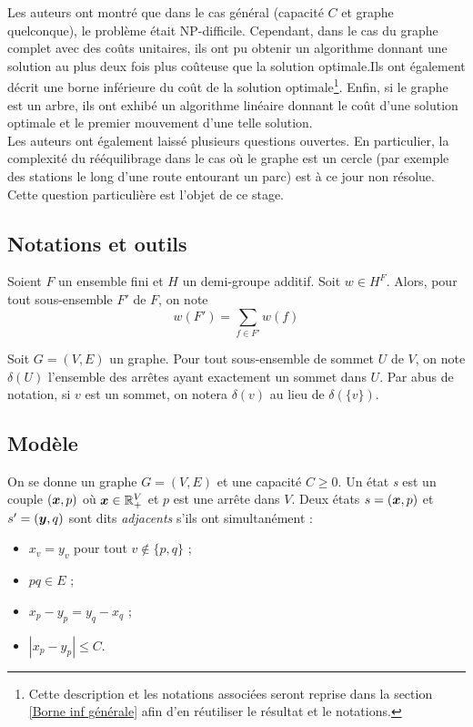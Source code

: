 \documentclass[twoside,11pt,openany,a4paper]{rapport}
\begin{document}
Les auteurs ont montré que dans le cas général (capacité $C$ et graphe quelconque), le problème était NP-difficile. Cependant, dans le cas du graphe complet avec des coûts unitaires, ils ont pu obtenir un algorithme donnant une solution au plus deux fois plus coûteuse que la solution optimale.Ils ont également décrit une borne inférieure du coût de la solution optimale\footnote{Cette description et les notations associées seront reprise dans la section \ref{Borne inf générale} afin d'en réutiliser le résultat et le notations.}. Enfin, si le graphe est un arbre, ils ont exhibé un algorithme linéaire donnant le coût d'une solution optimale et le premier mouvement d'une telle solution.
\\

Les auteurs ont également laissé plusieurs questions ouvertes. En particulier, la complexité du rééquilibrage dans le cas où le graphe est un cercle (par exemple des stations le long d'une route entourant un parc) est à ce jour non résolue. Cette question particulière est l'objet de ce stage.

\subsection{Notations et outils}

Soient $F$ un ensemble fini et $H$ un demi-groupe additif. Soit $w \in H^F$. Alors, pour tout sous-ensemble $F'$ de $F$, on note $$w(F') = \sum_{f \in F'} w(f)$$

Soit $G=(V,E)$ un graphe. Pour tout sous-ensemble de sommet $U$ de $V$, on note $\delta(U)$ l'ensemble des arrêtes ayant exactement un sommet dans $U$. Par abus de notation, si $v$ est un sommet, on notera $\delta(v)$ au lieu de $\delta(\{v\})$.

\subsection{Modèle}

On se donne un graphe $G=(V,E)$ et une capacité $C \ge 0$. Un état \emph{s} est un couple $(\boldsymbol{x},p)$ où $\boldsymbol{x} \in \mathbb{R}^V_+$ et $p$ est une arrête dans $V$. Deux états $s=(\boldsymbol{x},p)$ et $s'=(\boldsymbol{y},q)$ sont dits \emph{adjacents} s'ils ont simultanément :
\begin{itemize}
\item $x_v=y_v$ pour tout $v \notin \{p,q\}$ ;
\item $pq \in E$ ;
\item $x_p-y_p = y_q-x_q$ ;
\item $\left| x_p-y_p \right| \le C$.
\end{itemize}
\end{document}
